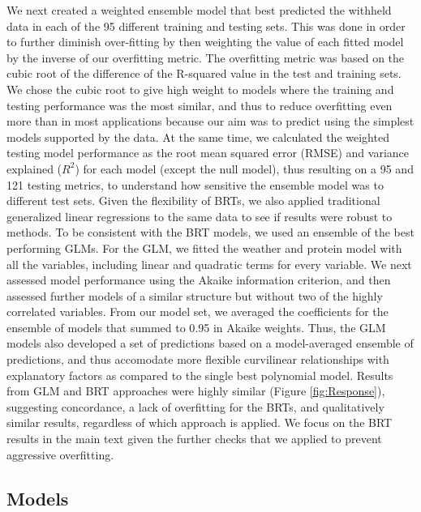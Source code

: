 \documentclass[9pt,twocolumn,twoside,lineno]{pnas-new}
\begin{document}
{We next created a weighted ensemble model that best predicted the withheld data in each of the 95 different training and testing sets. This was done in order to further diminish over-fitting by then weighting the value of each fitted model by the inverse of our overfitting metric. The overfitting metric was based on the cubic root of the difference of the R-squared value in the test and training sets. We chose the cubic root to give high weight to models where the training and testing performance was the most similar, and thus to reduce overfitting even more than in most applications because our aim was to predict using the simplest models supported by the data. At the same time, we calculated the weighted testing model performance as the root mean squared error (RMSE) and variance explained ($R^2$) for each model (except the null model), thus resulting on a 95 and 121 testing metrics, to understand how sensitive the ensemble model was to different test sets.
Given the flexibility of BRTs, we also applied traditional generalized linear regressions to the same data to see if results were robust to methods. To be consistent with the BRT models, we used an ensemble of the best performing GLMs. For the GLM, we fitted the weather and protein model with all the variables, including linear and quadratic terms for every variable. We next assessed model performance using the Akaike information criterion, and then assessed further models of a similar structure but without two of the highly correlated variables. From our model set, we averaged the coefficients for the ensemble of models that summed to 0.95 in Akaike weights. Thus, the GLM models also developed a set of predictions based on a model-averaged ensemble of predictions, and thus accomodate more flexible curvilinear relationships with explanatory factors as compared to the single best polynomial model. Results from GLM and BRT approaches were highly similar (Figure \ref{fig:Response}), suggesting concordance, a lack of overfitting for the BRTs, and qualitatively similar results, regardless of which approach is applied. We focus on the BRT results in the main text given the further checks that we applied to prevent aggressive overfitting. 


\subsection*{Models}

}
\end{document}
